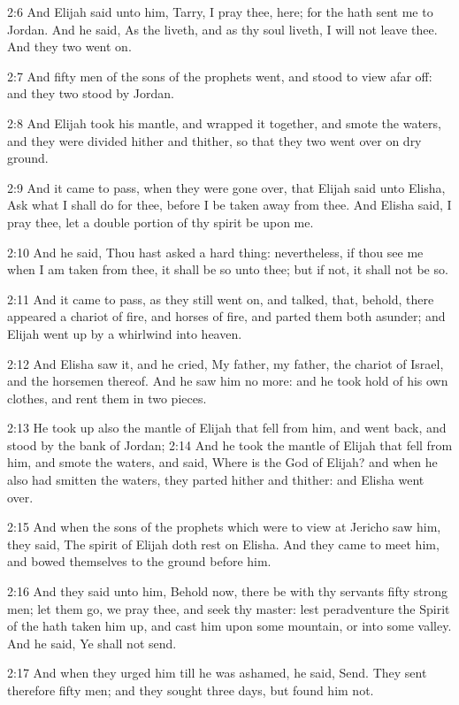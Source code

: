 2:6 And Elijah said unto him, Tarry, I pray thee, here; for the \LORD
hath sent me to Jordan. And he said, As the \LORD liveth, and as thy
soul liveth, I will not leave thee. And they two went on.

2:7 And fifty men of the sons of the prophets went, and stood to view
afar off: and they two stood by Jordan.

2:8 And Elijah took his mantle, and wrapped it together, and smote the
waters, and they were divided hither and thither, so that they two
went over on dry ground.

2:9 And it came to pass, when they were gone over, that Elijah said
unto Elisha, Ask what I shall do for thee, before I be taken away from
thee. And Elisha said, I pray thee, let a double portion of thy spirit
be upon me.

2:10 And he said, Thou hast asked a hard thing: nevertheless, if thou
see me when I am taken from thee, it shall be so unto thee; but if
not, it shall not be so.

2:11 And it came to pass, as they still went on, and talked, that,
behold, there appeared a chariot of fire, and horses of fire, and
parted them both asunder; and Elijah went up by a whirlwind into
heaven.

2:12 And Elisha saw it, and he cried, My father, my father, the
chariot of Israel, and the horsemen thereof. And he saw him no more:
and he took hold of his own clothes, and rent them in two pieces.

2:13 He took up also the mantle of Elijah that fell from him, and went
back, and stood by the bank of Jordan; 2:14 And he took the mantle of
Elijah that fell from him, and smote the waters, and said, Where is
the \LORD God of Elijah? and when he also had smitten the waters, they
parted hither and thither: and Elisha went over.

2:15 And when the sons of the prophets which were to view at Jericho
saw him, they said, The spirit of Elijah doth rest on Elisha. And they
came to meet him, and bowed themselves to the ground before him.

2:16 And they said unto him, Behold now, there be with thy servants
fifty strong men; let them go, we pray thee, and seek thy master: lest
peradventure the Spirit of the \LORD hath taken him up, and cast him
upon some mountain, or into some valley. And he said, Ye shall not
send.

2:17 And when they urged him till he was ashamed, he said, Send. They
sent therefore fifty men; and they sought three days, but found him
not.

